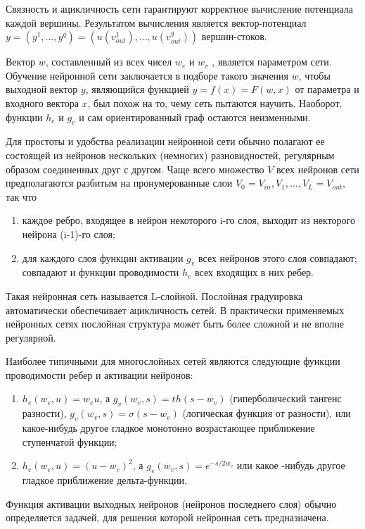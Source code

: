 Связность и ацикличность сети гарантируют корректное вычисление потенциала
каждой вершины. Результатом вычисления является вектор-потенциал $y =
(y^1,\dots,y^q) = (u(v_{out}^1),\dots,u(v_{out}^q))$ вершин-стоков.


Вектор $w$, составленный из всех чисел $w_e$ и $w_v$ , является параметром
сети. Обучение нейронной сети заключается в подборе такого значения $w$, чтобы
выходной вектор $y$, являющийся функцией $y = f(x) = F(w, x)$ от параметра и
входного вектора $x$, был похож на то, чему сеть пытаются научить. Наоборот,
функции $h_e$ и $g_v$ и сам ориентированный граф остаются неизменными.


Для простоты и удобства реализации нейронной сети обычно полагают ее состоящей
из нейронов нескольких (немногих) разновидностей, регулярным образом соединенных
друг с другом. Чаще всего множество $V$ всех нейронов сети предполагаются
разбитым на пронумерованные слои $V_0 = V_{in}, V_1,\dots,V_L = V_{out}$, так
что
\begin{enumerate}
\item каждое ребро, входящее в нейрон некоторого i-го слоя, выходит из некторого
нейрона (i-1)-го слоя;
\item для каждого слоя функции активации $g_v$ всех нейронов этого слоя
совпадают; совпадают и функции проводимости $h_e$ всех входящих в них ребер.
\end{enumerate}

Такая нейронная сеть называется L-слойной. Послойная градуировка автоматически
обеспечивает ацикличность сетей. В практически применяемых нейронных сетях
послойная структура может быть более сложной и не вполне регулярной.


Наиболее типичными для многослойных сетей являются следующие функции
проводимости ребер и активации нейронов:
\begin{enumerate}
\item $h_e(w_e,u) = w_eu$, а $g_v(w_v,s) = th(s - w_v)$ (гиперболический тангенс
разности), $g_v(w_v,s) = \sigma(s-w_v)$ (логическая функция от разности), или
какое-нибудь другое гладкое монотонно возрастающее приближение ступенчатой
функции;
\item $h_e(w_e,u) = (u - w_e)^2$, а $g_v(w_v,s) = e^{-s/2w_v}$ или какое -нибудь
другое гладкое приближение дельта-функции.
\end{enumerate} Функция активации выходных нейронов (нейронов последнего слоя)
обычно определяется задачей, для решения которой нейронная сеть предназначена.


